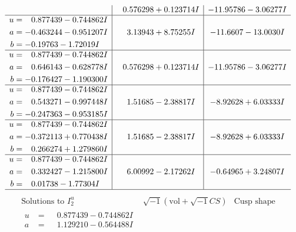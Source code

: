 \documentclass[1p]{elsarticle_modified}
\theoremstyle{definition}
\newcommand{\I}{\sqrt{-1}}
\begin{document}
$$\begin{array}{c|c|c}
 & \phantom{-}0.576298 + 0.123714 I & -11.95786 - 3.06277 I \\ \hline\begin{aligned}
u &= \phantom{-}0.877439 - 0.744862 I \\
a &= -0.463244 - 0.951207 I \\
b &= -0.19763 - 1.72019 I\end{aligned}
 & \phantom{-}3.13943 + 8.75255 I & -11.6607 - 13.0030 I \\ \hline\begin{aligned}
u &= \phantom{-}0.877439 - 0.744862 I \\
a &= \phantom{-}0.646143 - 0.628778 I \\
b &= -0.176427 - 1.190300 I\end{aligned}
 & \phantom{-}0.576298 + 0.123714 I & -11.95786 - 3.06277 I \\ \hline\begin{aligned}
u &= \phantom{-}0.877439 - 0.744862 I \\
a &= \phantom{-}0.543271 - 0.997448 I \\
b &= -0.247363 - 0.953185 I\end{aligned}
 & \phantom{-}1.51685 - 2.38817 I & -8.92628 + 6.03333 I \\ \hline\begin{aligned}
u &= \phantom{-}0.877439 - 0.744862 I \\
a &= -0.372113 + 0.770438 I \\
b &= \phantom{-}0.266274 + 1.279860 I\end{aligned}
 & \phantom{-}1.51685 - 2.38817 I & -8.92628 + 6.03333 I \\ \hline\begin{aligned}
u &= \phantom{-}0.877439 - 0.744862 I \\
a &= \phantom{-}0.332427 - 1.215800 I \\
b &= \phantom{-}0.01738 - 1.77304 I\end{aligned}
 & \phantom{-}6.00992 - 2.17262 I & -0.64965 + 3.24807 I\\
 \hline 
 \end{array}$$\newpage$$\begin{array}{c|c|c}  
\text{Solutions to }I^u_{2}& \I (\text{vol} + \sqrt{-1}CS) & \text{Cusp shape}\\
 \hline 
\begin{aligned}
u &= \phantom{-}0.877439 - 0.744862 I \\
a &= \phantom{-}1.129210 - 0.564488 I \\

\end{aligned}
\end{array}$$
\end{document}
